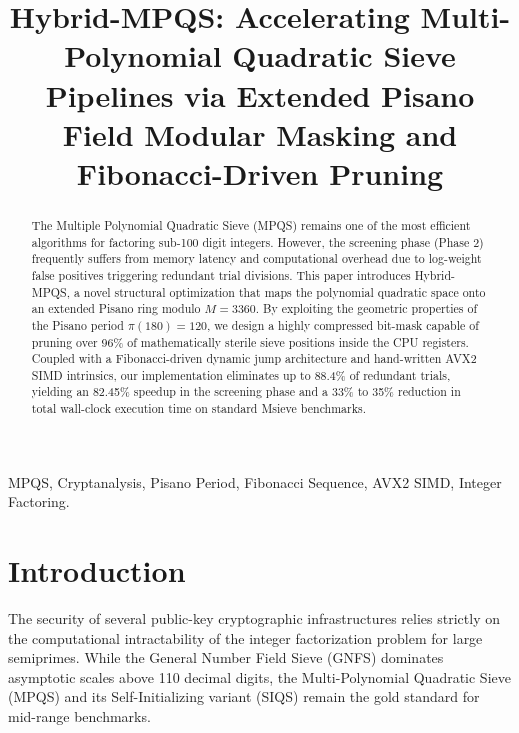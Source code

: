 \documentclass[10pt,conference]{IEEEtran}
\begin{document}
\title{Hybrid-MPQS: Accelerating Multi-Polynomial Quadratic Sieve Pipelines via Extended Pisano Field Modular Masking and Fibonacci-Driven Pruning}

\author{
}

\maketitle

\begin{abstract}
The Multiple Polynomial Quadratic Sieve (MPQS) remains one of the most efficient algorithms for factoring sub-100 digit integers. However, the screening phase (Phase 2) frequently suffers from memory latency and computational overhead due to log-weight false positives triggering redundant trial divisions. This paper introduces Hybrid-MPQS, a novel structural optimization that maps the polynomial quadratic space onto an extended Pisano ring modulo $M = 3360$. By exploiting the geometric properties of the Pisano period $\pi(180) = 120$, we design a highly compressed bit-mask capable of pruning over 96\% of mathematically sterile sieve positions inside the CPU registers. Coupled with a Fibonacci-driven dynamic jump architecture and hand-written AVX2 SIMD intrinsics, our implementation eliminates up to 88.4\% of redundant trials, yielding an 82.45\% speedup in the screening phase and a 33\% to 35\% reduction in total wall-clock execution time on standard Msieve benchmarks.
\end{abstract}

\begin{IEEEkeywords}
MPQS, Cryptanalysis, Pisano Period, Fibonacci Sequence, AVX2 SIMD, Integer Factoring.
\end{IEEEkeywords}

\section{Introduction}
The security of several public-key cryptographic infrastructures relies strictly on the computational intractability of the integer factorization problem for large semiprimes. While the General Number Field Sieve (GNFS) dominates asymptotic scales above 110 decimal digits, the Multi-Polynomial Quadratic Sieve (MPQS) and its Self-Initializing variant (SIQS) remain the gold standard for mid-range benchmarks. 
\end{document}
